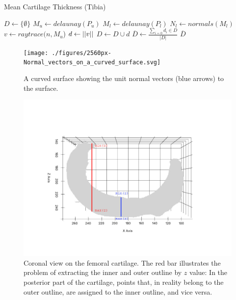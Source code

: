\begin{algorithm}
	\caption{Mean Cartilage Thickness (Tibia)}
	\label{algo:tibialthickness}
	\begin{algorithmic}[1]
		\State $D \gets \{\emptyset\}$
		\State $M_{u} \gets delaunay(P_{u})$
		\State $M_{l} \gets delaunay(P_{l})$
		\State $N_{l} \gets normals(M_{l})$
			\State $v \gets raytrace(n, M_{u}$)
			\State $d \gets \lvert \lvert v \rvert \rvert$
			\State $D \gets D \cup d$
		\EndFor
		\State $\overline{D} \gets \frac{\sum_{i = 0} d_{i} \in D}{\lvert D \rvert}$
		\State
		\Return $\overline{D}$
		\EndProcedure
	\end{algorithmic}
\end{algorithm}
\begin{figure}[]
	\centering
	\texttt{[image: ./figures/2560px-Normal\_vectors\_on\_a\_curved\_surface.svg]}
	\caption{A curved surface showing the unit normal vectors (blue arrows) to the surface. \cite{surfacenormals}}
	\label{fig:surfacenormals}
\end{figure}
\begin{figure}[]
	\centering
	\includegraphics[width=\linewidth]{./figures/femur_yz}
	\caption{Coronal view on the femoral cartilage. The red bar illustrates the problem of extracting the inner and outer outline by $z$ value: In the posterior part of the cartilage, points that, in reality belong to the outer outline, are assigned to the inner outline, and vice versa.}
	\label{fig:coronal_femur}
\end{figure}
